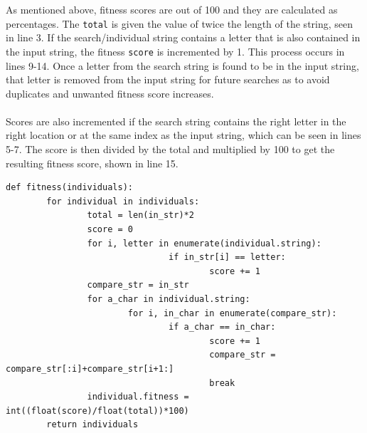 \documentclass[12pt]{article}
\begin{document}
As mentioned above, fitness scores are out of 100 and they are calculated as
percentages.  The \texttt{total} is given the value of twice the length of the
string, seen in line 3.  If the search/individual string contains a letter that
is also contained in the input string, the fitness \texttt{score} is incremented
by 1.  This process occurs in lines 9-14.  Once a letter from the search string
is found to be in the input string, that letter is removed from the input string
for future searches as to avoid duplicates and unwanted fitness score
increases.  
\\ \\
Scores are also incremented if the
search string contains the right letter in the right location or at the same
index as the input string, which can be seen in lines 5-7. The score is then
divided by the total and multiplied by 100 to get the resulting fitness score,
shown in line 15.

\begin{minipage}{\textwidth}

\begin{lstlisting}[caption = {Fitness Function}, label = {lst:fit}]
def fitness(individuals):
        for individual in individuals:
                total = len(in_str)*2
                score = 0
                for i, letter in enumerate(individual.string):
                                if in_str[i] == letter:
                                        score += 1
                compare_str = in_str
                for a_char in individual.string:
                        for i, in_char in enumerate(compare_str):
                                if a_char == in_char:
                                        score += 1
                                        compare_str = compare_str[:i]+compare_str[i+1:]
                                        break
                individual.fitness = int((float(score)/float(total))*100)                          
        return individuals
\end{lstlisting}
\end{minipage}
\end{document}
